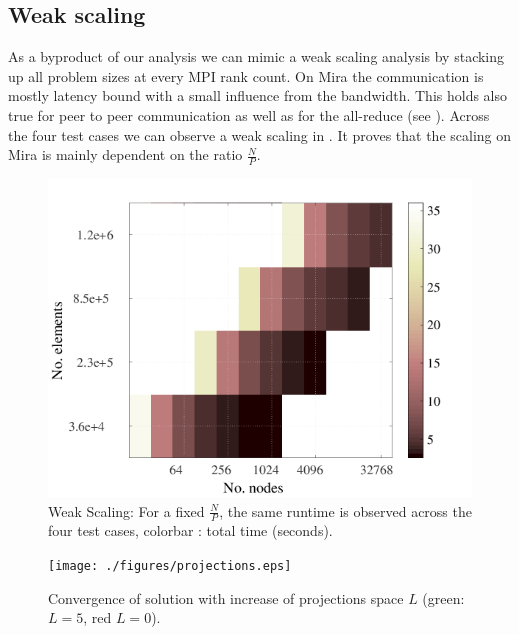 \documentclass{sig-alternate}
\begin{document}
\subsection{Weak scaling}
As a byproduct of our analysis we can mimic a weak scaling analysis by stacking up 
all problem sizes at every MPI rank count. On Mira the communication is mostly 
latency bound with a small influence from the
bandwidth. This holds also true for peer to peer communication as well as for the
all-reduce (see ). Across the four test cases we can observe 
a weak scaling in . It proves that the scaling on Mira is 
mainly dependent on the ratio $\frac{N}{P}$. 
\begin{figure}
  \centering
  \includegraphics[width=\linewidth]{./figures/weak.png}
  \caption{Weak Scaling: For a fixed $\frac{N}{P}$, the same runtime is
  observed across the four test cases, colorbar : total time (seconds).}
  \label{fig:weakscaling}
\end{figure}

\begin{figure}
  \centering
  \texttt{[image: ./figures/projections.eps]}
  \caption{Convergence of solution with increase of projections space $L$ (green: $L=5$, red $L=0$).}
  \label{fig:projections}
\end{figure}
\end{document}
